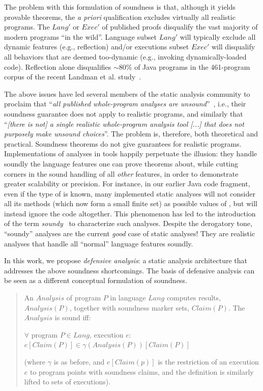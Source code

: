 The problem with this formulation of soundness is that, although it yields provable theorems, the \emph{a priori} qualification excludes virtually all realistic programs. The $Lang'$ or $Exec'$ of published proofs disqualify the vast majority of modern programs ``in the wild''. Language subset $Lang'$ will typically exclude all dynamic features (e.g., reflection) and/or executions subset $Exec'$ will disqualify all behaviors that are deemed too-dynamic (e.g., invoking dynamically-loaded code). Reflection alone disqualifies $\sim$80\% of Java programs in the 461-program corpus of the recent Landman et al. study~\cite{icse:2017:Landman}.

The above issues have led several members of the static analysis community to proclaim that ``\emph{all published whole-program analyses are unsound}''~\cite{article:2015:Livshits}, i.e., their soundness guarantee does not apply to realistic programs, and similarly that ``\emph{[there is not] a single realistic whole-program analysis tool [...] that does not purposely make unsound choices}''. The problem is, therefore, both theoretical and practical. Soundness theorems do not give guarantees for realistic programs. Implementations of analyses in tools happily perpetuate the illusion: they handle soundly the language features one can prove theorems about, while cutting corners in the sound handling of all \emph{other} features, in order to demonstrate greater scalability or precision. For instance, in our earlier Java code fragment, even if the type of  is known, many implemented static analyses will not consider all its methods (which now form a small finite set) as possible values of , but will instead ignore the code altogether. This phenomenon has led to the introduction of the term \emph{soundy}~\cite{article:2015:Livshits} to characterize such analyses. Despite the derogatory tone, ``soundy'' analyses are the current \emph{good} case of static analyses! They are realistic analyses that handle all ``normal'' language features soundly.

In this work, we propose \emph{defensive analysis}: a static analysis architecture that addresses the above soundness shortcomings. The basis of defensive analysis can be seen as a different conceptual formulation of soundness.

\begin{quote}
An $Analysis$ of program $P$ in language $Lang$ computes results, $Analysis(P)$, together with soundness marker sets, $Claim(P)$. The $Analysis$ is sound iff:

\hspace{8 mm} $\forall$ program $P \in Lang$, execution $e$: $e[Claim(P)] \in \gamma(Analysis(P))[Claim(P)]$

(where $\gamma$ is as before, and $e[Claim(p)]$ is the restriction of an execution $e$ to program points with soundness claims, and the definition is similarly lifted to sets of executions).
\end{quote}

